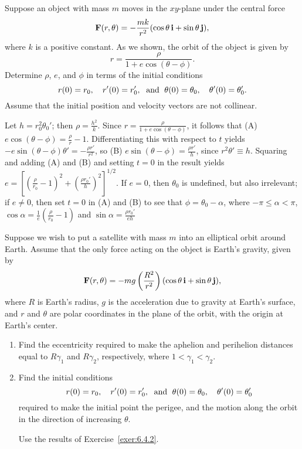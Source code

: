 \documentclass{ximera}
\begin{document}
\begin{problem}\label{exer:6.4.2}
Suppose an object with mass $m$ moves in the $xy$-plane under the
central force
$$
{\bf F}(r,\theta)=-\frac{mk}{r^2}(\cos\theta\,{\bf i}+\sin\theta\,{\bf
j}),
$$
where $k$ is a positive constant. As we shown, the orbit of the
object is given by
$$
r=\frac{\rho}{1+e\cos(\theta-\phi)}.
$$
Determine $\rho$, $e$, and $\phi$ in terms of the initial conditions
$$
r(0)=r_0,\quad  r'(0)=r_0', \text{\; and \;} \theta(0)=\theta_0,\quad
\theta'(0)=\theta_0'.
$$
Assume that the initial position and velocity vectors are not
collinear.

\begin{solution}
    Let $h=r_0^2\theta_0'$; then $\rho=\frac{h^2}{ k}$. Since
$r=\frac{\rho}{ 1+e\cos(\theta-\phi)}$, it follows that (A)
$e\cos(\theta-\phi)=\frac{\rho}{ r}-1$. Differentiating this with
respect to $t$ yields $-e\sin(\theta-\phi)\theta'=-\frac{\rho r'}{
r^2}$, so (B) $e\sin(\theta-\phi)=\frac{\rho r'}{ h}$, since
$r^2\theta'\equiv h$.
Squaring and adding (A) and (B) and setting $t=0$ in the result yields
$e=\left[\left(\frac{\rho}{ r_0}-1\right)^2+\left(\frac{\rho r_0'}{
h}\right)^2\right]^{1/2}$. If $e=0$, then $\theta_0$ is undefined, but
also irrelevant; if $e\ne0$, then set $t=0$ in (A) and (B) to see that
$\phi=\theta_0-\alpha$, where $-\pi\le\alpha<\pi$,
$\cos\alpha=\frac{1}{ e}\left(\frac{\rho}{ r_0}-1\right)$ and
$\sin\alpha=\frac{\rho r_0'}{ eh}$

\end{solution}
\end{problem}

\begin{problem}\label{exer:6.4.3}
Suppose we wish to put a satellite with mass $m$ into an
elliptical orbit around Earth. Assume that the only force acting on
the object is Earth's gravity, given by
$$
{\bf F}(r,\theta)=-mg\left(\frac{R^2}{r^2}\right)(\cos\theta\,{\bf
i}+\sin\theta\,{\bf j}),
$$
where $R$ is Earth's radius, $g$ is the acceleration due to gravity at
Earth's surface, and $r$ and $\theta$ are polar coordinates in the
plane of the orbit, with the origin at Earth's center.

\begin{enumerate}
\item %
Find the eccentricity required to make the aphelion and perihelion
distances equal to $R\gamma_1$ and $R\gamma_2$, respectively, where
$1<\gamma_1<\gamma_2$.
\item %
Find the  initial conditions
$$
r(0)=r_0,\quad  r'(0)=r_0', \text{\; and \;} \theta(0)=\theta_0,\quad
\theta'(0)=\theta_0'
$$
required to make the initial point the perigee, and the motion along
the orbit in the direction of increasing $\theta$. 
\begin{hint}
    Use the
results of Exercise~\ref{exer:6.4.2}.
\end{hint}
\end{enumerate}
\end{problem}
\end{document}

